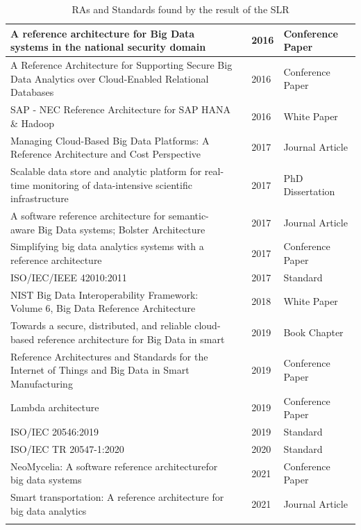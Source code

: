 \documentclass[review]{elsarticle}
\begin{document}
\begin{longtable}{|p{5cm} | p{1cm}  | p{1cm} | p{3.4cm}|}
    \hline
    A reference architecture for Big Data systems in the national security domain  & \cite{klein2016reference}  & 2016 & Conference Paper \\ [1ex]
    \hline
    A Reference Architecture for Supporting Secure Big Data Analytics over Cloud-Enabled Relational Databases  & \cite{cuzzocrea2016reference}  & 2016 & Conference Paper \\ [1ex]
    \hline
    SAP - NEC Reference Architecture for SAP HANA \& Hadoop   &
    \cite{SAPRA} & 2016 & White Paper \\ [1ex]
    \hline
    Managing Cloud-Based Big Data Platforms: A Reference Architecture and Cost Perspective  & \cite{heilig2017managing} & 2017 & Journal Article \\ [1ex]
    \hline
    Scalable data store and analytic platform for real-time monitoring of data-intensive scientific infrastructure   & \cite{heilig2017managing} & 2017 & PhD Dissertation \\ [1ex]
    \hline
    A software reference architecture for semantic-aware Big Data systems; Bolster Architecture   & \cite{nadal2017software} & 2017 & Journal Article \\ [1ex]
    \hline
    Simplifying big data analytics systems with a reference architecture
    &
    \cite{sang2017simplifying} & 2017 & Conference Paper \\ [1ex]
    \hline
    ISO/IEC/IEEE 42010:2011 & \cite{ISO42010} & 2017 & Standard \\ [1ex]
    \hline
    NIST Big Data Interoperability Framework: Volume 6, Big Data Reference Architecture
    & \cite{Chang} & 2018 & White Paper \\ [1ex]
    \hline
    Towards a secure, distributed, and reliable cloud-based reference architecture for Big Data in smart   & \cite{kohler2019towards} & 2019 & Book Chapter \\ [1ex]
    \hline
    Reference Architectures and Standards for the Internet of Things and Big Data in Smart Manufacturing   & \cite{unal2019reference} & 2019 & Conference Paper \\ [1ex]
    \hline
    Lambda architecture & \cite{kiran2015lambda} & 2019 & Conference Paper \\ [1ex]
    \hline
    ISO/IEC 20546:2019 & \cite{ISO20546} & 2019 & Standard \\ [1ex]
    \hline
    ISO/IEC TR 20547-1:2020 & \cite{ISO20547} & 2020 & Standard \\ [1ex]
    \hline
    NeoMycelia: A software reference architecturefor big data systems
    &
    \cite{AtaeiApsec} & 2021 & Conference Paper \\ [1ex]
    \hline
    Smart transportation: A reference architecture for big data analytics
    &
    \cite{castellanos2021smart} & 2021 & Journal Article \\ [1ex]
    \hline
    \caption{RAs and Standards found by the result of the SLR}
    \label{table:SLR}
\end{longtable}
\end{document}
